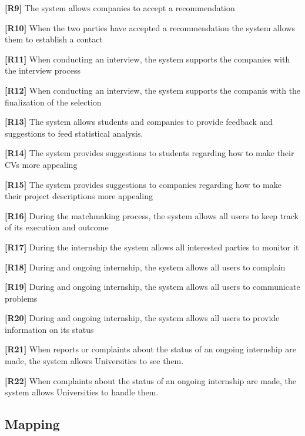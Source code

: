 \textbf{[R9]} The system allows companies to accept a recommendation 

\textbf{[R10]}  When the two parties have accepted a recommendation the system allows them to establish a contact

\textbf{[R11]} When conducting an interview, the system supports the companies with the interview process

\textbf{[R12]} When conducting an interview, the system supports the companis with the finalization of the selection

\textbf{[R13]} The system allows students and companies to provide feedback and suggestions to feed statistical analysis.

\textbf{[R14] }The system provides suggestions to students regarding how to make their CVs more appealing

\textbf{[R15]} The system provides suggestions to companies regarding how to make their project descriptions more appealing

\textbf{[R16]} During the matchmaking process, the system allows all users to keep track of its execution and outcome

\textbf{[R17]} During the internship the system allows all interested parties to monitor it

\textbf{[R18]} During and ongoing internship, the system allows all users to complain 

\textbf{[R19]} During and ongoing internship, the system allows all users to communicate problems 

\textbf{[R20]} During and ongoing internship, the system allows all users to provide information on its status

\textbf{[R21]} When reports or complaints about the status of an ongoing internship are made, the system allows Universities to see them.

\textbf{[R22]} When complaints about the status of an ongoing internship are made, the system allows Universities to handle them.



\subsection{Mapping}



